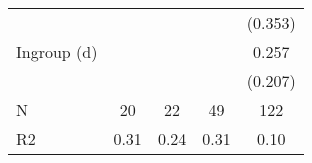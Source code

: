 {\begin{tabular}{l*{4}{c}}
                    &                     &                     &                     &     (0.353)         \\
[1em]
Ingroup (d)         &                     &                     &                     &       0.257         \\
                    &                     &                     &                     &     (0.207)         \\
\hline
N                   &          20         &          22         &          49         &         122         \\
R2                  &        0.31         &        0.24         &        0.31         &        0.10         \\
\hline\hline
\end{tabular}
}
